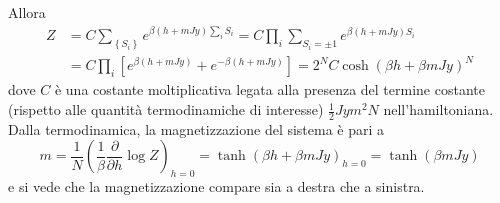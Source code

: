 \documentclass[11pt, a4paper]{scrartcl}
\theoremstyle{style}
\theoremstyle{style1}
\numberwithin{equation}{subsection}
\begin{document}
Allora 
\begin{equation}\label{cic}
	\begin{split}
		Z &= C \sum_{\left\{ S_i \right\} }^{} e^{\beta (h + mJy) \sum_{i}^{} S_i} = C \prod_i \sum_{S_i = \pm 1}^{} e^{\beta (h+mJy)S_i}\\
		  &=C \prod_i \left[ e^{\beta (h+mJy)}+ e ^{-\beta (h+mJy)} \right] = 2^N C \cosh\left(\beta h + \beta mJy\right) ^N
	\end{split}
\end{equation}
dove $C$ \`e una costante moltiplicativa legata alla presenza del termine costante (rispetto alle quantit\`a termodinamiche di interesse) $\frac{1}{2}Jy m^2 N$ nell'hamiltoniana.
Dalla termodinamica, la magnetizzazione del sistema \`e pari a 
\begin{equation}\label{mising}
m = \frac{1}{N} \left(\frac{1}{\beta }\frac{\partial }{\partial h} \log Z\right) _{h=0}  = \tanh \left(\beta h + \beta m Jy\right)_{h=0} =\tanh \left(\beta mJy\right) 
\end{equation}
e si vede che la magnetizzazione compare sia a destra che a sinistra.
\end{document}
